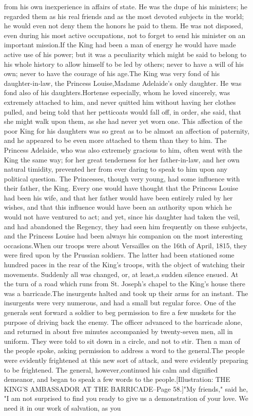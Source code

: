 \documentclass[a4paper]{article}
\begin{document}
from his own inexperience in affairs of state. He was the dupe of his ministers; he regarded them as his real friends and as the most devoted subjects in the world; he would even not deny them the honors he paid to them. He was not disposed, even during his most active occupations, not to forget to send his minister on an important mission.If the King had been a man of energy he would have made active use of his power; but it was a peculiarity which might be said to belong to his whole history to allow himself to be led by others; never to have a will of his own; never to have the courage of his age.The King was very fond of his daughter-in-law, the Princess Louise,Madame Adelaide's only daughter. He was fond also of his daughters.Hortense especially, whom he loved sincerely, was extremely attached to him, and never quitted him without having her clothes pulled, and being told that her petticoats would fall off, in order, she said, that she might walk upon them, as she had never yet worn one. This affection of the poor King for his daughters was so great as to be almost an affection of paternity, and he appeared to be even more attached to them than they to him. The Princess Adelaide, who was also extremely gracious to him, often went with the King the same way; for her great tenderness for her father-in-law, and her own natural timidity, prevented her from ever daring to speak to him upon any political question. The Princesses, though very young, had some influence with their father, the King. Every one would have thought that the Princess Louise had been his wife, and that her father would have been entirely ruled by her wishes, and that this influence would have been an authority upon which he would not have ventured to act; and yet, since his daughter had taken the veil, and had abandoned the Regency, they had seen him frequently on these subjects, and the Princess Louise had been always his companion on the most interesting occasions.When our troops were about Versailles on the 16th of April, 1815, they were fired upon by the Prussian soldiers. The latter had been stationed some hundred paces in the rear of the King's troops, with the object of watching their movements. Suddenly all was changed, or, at least,a sudden silence ensued. At the turn of a road which runs from St. Joseph's chapel to the King's house there was a barricade.The insurgents halted and took up their arms for an instant. The insurgents were very numerous, and had a small but regular force. One of the generals sent forward a soldier to beg permission to fire a few muskets for the purpose of driving back the enemy. The officer advanced to the barricade alone, and returned in about five minutes accompanied by twenty-seven men, all in uniform. They were told to sit down in a circle, and not to stir. Then a man of the people spoke, asking permission to address a word to the general.The people were evidently frightened at this new sort of attack, and were evidently preparing to be frightened. The general, however,continued his calm and dignified demeanor, and began to speak a few words to the people.[Illustration: THE KING'S AMBASSADOR AT THE BARRICADE--Page 58.]"My friends," said he, "I am not surprised to find you ready to give us a demonstration of your love. We need it in our work of salvation, as you 
\end{document}
